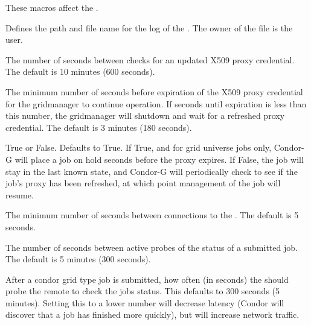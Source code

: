 These macros affect the .
\begin{description}

\label{param:GridmanagerLog}
\item[\Macro{GRIDMANAGER\_LOG}]
  Defines the path and file name for the log of the . 
  The owner of the file is the  user.

\label{param:GridmanagerCheckproxyInterval}
\item[\Macro{GRIDMANAGER\_CHECKPROXY\_INTERVAL}]
  The number of seconds
  between checks for an updated X509 proxy credential. The default
  is 10 minutes (600 seconds).

\label{param:GridmanagerMinimumProxyTime}
\item[\Macro{GRIDMANAGER\_MINIMUM\_PROXY\_TIME}]
  The minimum number of
  seconds before expiration of the X509 proxy credential for the
  gridmanager to continue operation. If seconds until expiration is
  less than this number, the gridmanager will shutdown and wait for
  a refreshed proxy credential. The default is 3 minutes (180 seconds).

\label{param:HoldJobIfCredentialExpires}
\item[\Macro{HOLD\_JOB\_IF\_CREDENTIAL\_EXPIRES}]
  True or False.  Defaults to True.
  If True, and for grid universe jobs only,
  Condor-G will place a job on hold
   seconds
  before the proxy expires.
  If False,
  the job will stay in the last known state,
  and Condor-G will periodically check to see if the job's proxy has been
  refreshed, at which point management of the job will resume.

\label{param:GridmanagerContactScheddDelay}
\item[\Macro{GRIDMANAGER\_CONTACT\_SCHEDD\_DELAY}]
  The minimum number of
  seconds between connections to the . The default is 5 seconds.

\label{param:GridmanagerJobProbeInterval}
\item[\Macro{GRIDMANAGER\_JOB\_PROBE\_INTERVAL}]
  The number of seconds between
  active probes of the status of a submitted job.
  The default is 5 minutes (300 seconds).

\label{param:CondorJobPollInterval}
\item[\Macro{CONDOR\_JOB\_POLL\_INTERVAL}]
  After a condor grid type job is submitted,
  how often (in seconds) the 
  should probe the remote  to check the jobs status.  
  This defaults to 300 seconds (5 minutes).
  Setting this to a lower number will decrease latency (Condor will discover
  that a job has finished more quickly), but will increase network traffic.



\end{description}
